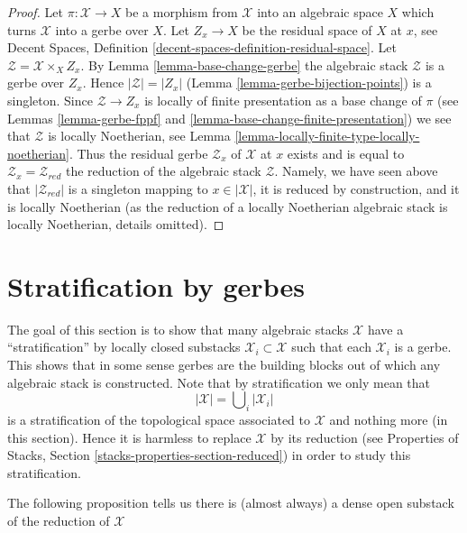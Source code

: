 \begin{proof}
Let $\pi : \mathcal{X} \to X$ be a morphism from $\mathcal{X}$ into
an algebraic space $X$ which turns $\mathcal{X}$ into a gerbe over $X$.
Let $Z_x \to X$ be the residual space of $X$ at $x$, see
Decent Spaces, Definition \ref{decent-spaces-definition-residual-space}.
Let $\mathcal{Z} = \mathcal{X} \times_X Z_x$. By
Lemma \ref{lemma-base-change-gerbe}
the algebraic stack $\mathcal{Z}$ is a gerbe over $Z_x$.
Hence $|\mathcal{Z}| = |Z_x|$
(Lemma \ref{lemma-gerbe-bijection-points})
is a singleton. Since $\mathcal{Z} \to Z_x$ is locally of finite presentation
as a base change of $\pi$ (see
Lemmas \ref{lemma-gerbe-fppf} and \ref{lemma-base-change-finite-presentation})
we see that $\mathcal{Z}$ is locally Noetherian, see
Lemma \ref{lemma-locally-finite-type-locally-noetherian}.
Thus the residual gerbe $\mathcal{Z}_x$ of $\mathcal{X}$ at $x$
exists and is equal to $\mathcal{Z}_x = \mathcal{Z}_{red}$ the reduction
of the algebraic stack $\mathcal{Z}$. Namely, we have seen above
that $|\mathcal{Z}_{red}|$ is a singleton mapping to $x \in |\mathcal{X}|$,
it is reduced by construction, and it is locally Noetherian (as the
reduction of a locally Noetherian algebraic stack is locally Noetherian,
details omitted).
\end{proof}









\section{Stratification by gerbes}
\label{section-stratify}

\noindent
The goal of this section is to show that many algebraic stacks
$\mathcal{X}$ have a ``stratification'' by locally closed substacks
$\mathcal{X}_i \subset \mathcal{X}$ such that each $\mathcal{X}_i$ is
a gerbe. This shows that in some sense gerbes are the building blocks
out of which any algebraic stack is constructed. Note that by stratification
we only mean that
$$
|\mathcal{X}| = \bigcup\nolimits_i |\mathcal{X}_i|
$$
is a stratification of the topological space associated to $\mathcal{X}$
and nothing more (in this section). Hence it is harmless to replace
$\mathcal{X}$ by its reduction (see
Properties of Stacks, Section \ref{stacks-properties-section-reduced})
in order to study this stratification.

\medskip\noindent
The following proposition tells us there is (almost always) a dense
open substack of the reduction of $\mathcal{X}$

